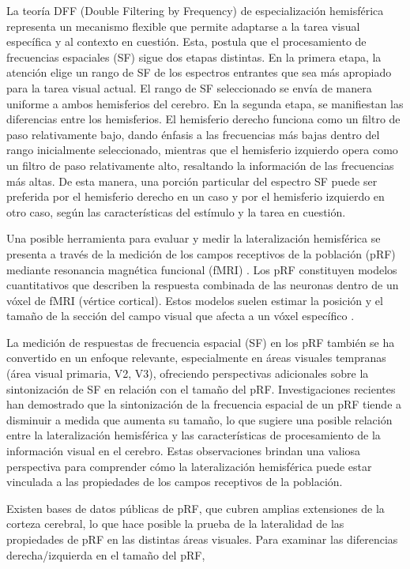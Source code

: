\documentclass{article}
\begin{document}
	La teoría DFF (Double Filtering by Frequency) de especialización hemisférica representa un mecanismo flexible que permite adaptarse a la tarea visual específica y al contexto en cuestión. Esta, postula que el procesamiento de frecuencias espaciales (SF) sigue dos etapas distintas. En la primera etapa, la atención elige un rango de SF de los espectros entrantes que sea más apropiado para la tarea visual actual. El rango de SF seleccionado se env\'ia de manera uniforme a ambos hemisferios del cerebro. En la segunda etapa, se manifiestan las diferencias entre los hemisferios. El hemisferio derecho funciona como un filtro de paso relativamente bajo, dando énfasis a las frecuencias más bajas dentro del rango inicialmente seleccionado, mientras que el hemisferio izquierdo opera como un filtro de paso relativamente alto, resaltando la información de las frecuencias más altas. De esta manera, una porci\'on particular del espectro SF puede ser preferida por el hemisferio derecho en un caso y por el hemisferio izquierdo en otro caso, seg\'un las caracter\'isticas del est\'imulo y la tarea en cuesti\'on.
	
		
	Una posible herramienta para evaluar y medir la lateralización hemisférica se presenta a través de la medición de los campos receptivos de la población (pRF) mediante resonancia magnética funcional (fMRI) \cite{dumoulin_population_2008} . Los pRF constituyen modelos cuantitativos que describen la respuesta combinada de las neuronas dentro de un vóxel de fMRI (vértice cortical). Estos modelos suelen estimar la posición y el tamaño de la sección del campo visual que afecta a un vóxel específico \cite{wandell_computational_2015}. 
	
	La medición de respuestas de frecuencia espacial (SF) en los pRF también se ha convertido en un enfoque relevante, especialmente en áreas visuales tempranas (área visual primaria, V2, V3), ofreciendo perspectivas adicionales sobre la sintonización de SF en relación con el tamaño del pRF. Investigaciones recientes \cite{broderick_mapping_2022} han demostrado que la sintonización de la frecuencia espacial de un pRF tiende a disminuir a medida que aumenta su tamaño, lo que sugiere una posible relación entre la lateralización hemisférica y las características de procesamiento de la información visual en el cerebro. Estas observaciones brindan una valiosa perspectiva para comprender cómo la lateralización hemisférica puede estar vinculada a las propiedades de los campos receptivos de la población.
	
	
	Existen bases de datos p\'ublicas de pRF, que cubren amplias extensiones de la corteza cerebral, lo que hace posible la prueba de la lateralidad de las propiedades de pRF en las distintas \'areas visuales. Para examinar las diferencias derecha/izquierda en el tamaño del pRF, 
	
\end{document}
